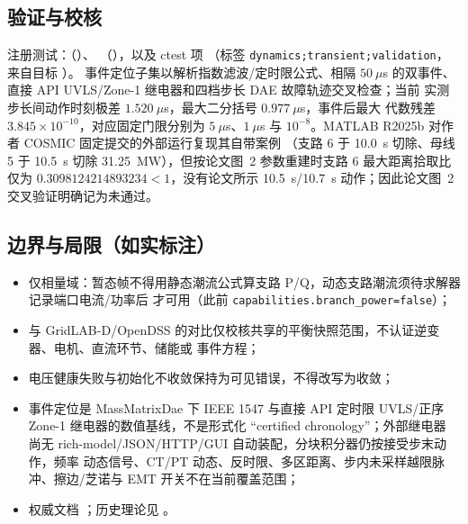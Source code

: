 \documentclass[UTF8,fontset=fandol,a4paper,11pt]{ctexart}
\begin{document}
\subsection{验证与校核}
注册测试：（）、
（），以及
ctest 项 （标签
\texttt{dynamics;transient;validation}，来自目标 ）。
事件定位子集以解析指数滤波/定时限公式、相隔 $50~\mu$s 的双事件、直接 API
UVLS/Zone-1 继电器和四档步长 DAE 故障轨迹交叉检查；当前
实测步长间动作时刻极差 $1.520~\mu$s，最大二分括号 $0.977~\mu$s，事件后最大
代数残差 $3.845\times10^{-10}$，对应固定门限分别为 $5~\mu$s、$1~\mu$s 与
$10^{-8}$。MATLAB R2025b 对作者 COSMIC 固定提交的外部运行复现其自带案例
（支路 6 于 10.0~s 切除、母线 5 于 10.5~s 切除 31.25~MW），但按论文图~2
参数重建时支路 6 最大距离拾取比仅为 $0.3098124214893234<1$，没有论文所示
10.5~s/10.7~s 动作；因此论文图~2 交叉验证明确记为未通过。

\subsection{边界与局限（如实标注）}
\begin{itemize}
  \item 仅相量域：暂态帧不得用静态潮流公式算支路 P/Q，动态支路潮流须待求解器记录端口电流/功率后
        才可用（此前 \texttt{capabilities.branch\_power=false}）；
  \item 与 GridLAB-D/OpenDSS 的对比仅校核共享的平衡快照范围，不认证逆变器、电机、直流环节、储能或
        事件方程；
  \item 电压健康失败与初始化不收敛保持为可见错误，不得改写为收敛；
  \item 事件定位是 MassMatrixDae 下 IEEE 1547 与直接 API 定时限 UVLS/正序
        Zone-1 继电器的数值基线，不是形式化 ``certified chronology''；外部继电器
        尚无 rich-model/JSON/HTTP/GUI 自动装配，分块积分器仍按接受步末动作，频率
        动态信号、CT/PT 动态、反时限、多区距离、步内未采样越限脉冲、擦边/芝诺与
        EMT 开关不在当前覆盖范围；
  \item 权威文档 ；历史理论见
        。
\end{itemize}

\end{document}
